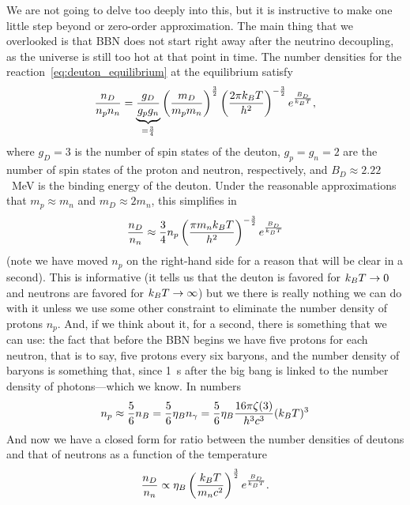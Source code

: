We are not going to delve too deeply into this, but it is instructive to make one
little step beyond or zero-order approximation. The main thing that we overlooked
is that BBN does not start right away after the neutrino decoupling, as the universe
is still too hot at that point in time. The number densities for the
reaction~\eqref{eq:deuton_equilibrium} at the equilibrium satisfy
\begin{align}
  \frac{n_D}{n_p n_n} =
  \underbrace{\frac{g_D}{g_p g_n}}_{=\frac{3}{4}}
  \left( \frac{m_D}{m_p m_n} \right)^\frac{3}{2}
  \left( \frac{2\pi k_B T}{h^2} \right)^{-\frac{3}{2}} e^\frac{B_D}{k_B T},
\end{align}
where $g_D = 3$ is the number of spin states of the deuton, $g_p = g_n = 2$ are the
number of spin states of the proton and neutron, respectively, and $B_D \approx 2.22$~MeV
is the binding energy of the deuton. Under the reasonable approximations that
$m_p \approx m_n$ and $m_D \approx 2 m_n$, this simplifies in
\begin{align*}
  \frac{n_D}{n_n} \approx
  \frac{3}{4} n_p \left( \frac{\pi m_n k_B T}{h^2} \right)^{-\frac{3}{2}} e^\frac{B_D}{k_B T}
\end{align*}
(note we have moved $n_p$ on the right-hand side for a reason that will be clear
in a second). This is informative (it tells us that the deuton is favored for
$k_B T \rightarrow 0$ and neutrons are favored for $k_B T \rightarrow \infty$) but we
there is really nothing we can do with it unless we use some other constraint to
eliminate the number density of protons $n_p$. And, if we think about it, for a second,
there is something that we can use: the fact that before the BBN begins we have
five protons for each neutron, that is to say, five protons every six baryons, and
the number density of baryons is something that, since 1~s after the big bang is
linked to the number density of photons---which we know. In numbers
\begin{align*}
  n_p \approx \frac{5}{6} n_B = \frac{5}{6} \eta_B n_\gamma =
  \frac{5}{6} \eta_B \frac{16 \pi \zeta(3)}{h^3 c^3} (k_B T)^3
\end{align*}
And now we have a closed form for ratio between the number densities of deutons
and that of neutrons as a function of the temperature
\begin{align*}
  \frac{n_D}{n_n} \propto
  \eta_B \left( \frac{k_B T}{m_n c^2} \right)^{\frac{3}{2}} e^\frac{B_D}{k_B T}.
\end{align*}


